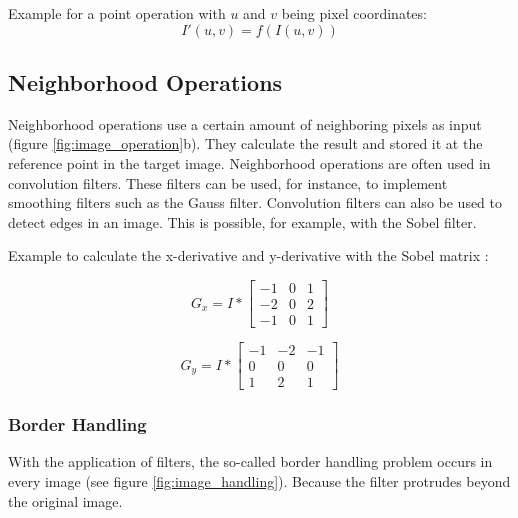 Example for a point operation with $u$ and $v$ being pixel coordinates:
\begin{equation}
    I'(u, v) = f(I(u, v))
    \label{eq:point_operation}
\end{equation}

\subsection{Neighborhood Operations}
Neighborhood operations use a certain amount of neighboring pixels as input (figure \ref{fig:image_operation}b).
They calculate the result and stored it at the reference point in the target
image. Neighborhood operations are often used in convolution filters. These
filters can be used, for instance, to implement smoothing filters such as the
Gauss filter. Convolution filters can also be used to detect edges in an image. This is possible, for example, with the Sobel filter.

Example to calculate the x-derivative and y-derivative with the Sobel matrix \cite{sobel_matrix}:

\noindent\begin{minipage}{.5\linewidth}
\begin{equation}
    G_{x} = I * \begin{bmatrix}
                -1 & 0 & 1 \\ 
                -2 & 0 & 2 \\ 
                -1 & 0 & 1
                \end{bmatrix}
    \label{eq:neighborhood_operation}
\end{equation}

\end{minipage}%
\begin{minipage}{.5\linewidth}

\begin{equation}
    G_{y} = I * \begin{bmatrix}
                -1 & -2 & -1 \\ 
                0 & 0 & 0 \\ 
                1 & 2 & 1
                \end{bmatrix}
    \label{eq:neighborhood_operation}
\end{equation} 

\end{minipage}

\subsubsection*{Border Handling}
With the application of filters, the so-called border handling problem occurs in every image (see figure \ref{fig:image_handling}). Because the filter protrudes beyond the original image.

